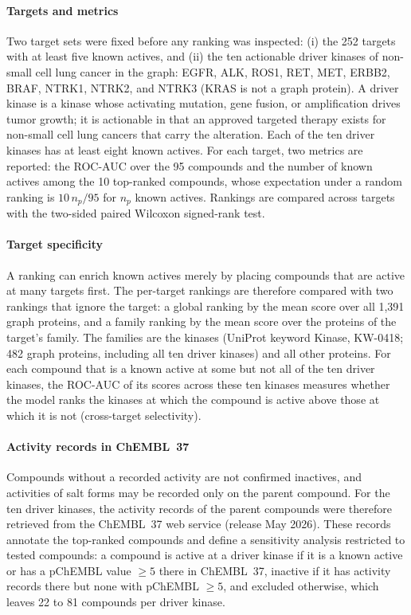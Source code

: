 \documentclass[11pt,letterpaper]{article}
\begin{document}
\paragraph{Targets and metrics}
Two target sets were fixed before any ranking was inspected: (i) the 252 targets with at least five known actives, and (ii) the ten actionable driver kinases of non-small cell lung cancer in the graph: EGFR, ALK, ROS1, RET, MET, ERBB2, BRAF, NTRK1, NTRK2, and NTRK3 (KRAS is not a graph protein). A driver kinase is a kinase whose activating mutation, gene fusion, or amplification drives tumor growth; it is actionable in that an approved targeted therapy exists for non-small cell lung cancers that carry the alteration. Each of the ten driver kinases has at least eight known actives. For each target, two metrics are reported: the ROC-AUC over the 95 compounds and the number of known actives among the 10 top-ranked compounds, whose expectation under a random ranking is $10\,n_p/95$ for $n_p$ known actives. Rankings are compared across targets with the two-sided paired Wilcoxon signed-rank test.

\paragraph{Target specificity}
A ranking can enrich known actives merely by placing compounds that are active at many targets first. The per-target rankings are therefore compared with two rankings that ignore the target: a global ranking by the mean score over all 1,391 graph proteins, and a family ranking by the mean score over the proteins of the target's family. The families are the kinases (UniProt keyword Kinase, KW-0418; 482 graph proteins, including all ten driver kinases) and all other proteins. For each compound that is a known active at some but not all of the ten driver kinases, the ROC-AUC of its scores across these ten kinases measures whether the model ranks the kinases at which the compound is active above those at which it is not (cross-target selectivity).

\paragraph{Activity records in ChEMBL~37}
Compounds without a recorded activity are not confirmed inactives, and activities of salt forms may be recorded only on the parent compound. For the ten driver kinases, the activity records of the parent compounds were therefore retrieved from the ChEMBL~37 web service (release May 2026). These records annotate the top-ranked compounds and define a sensitivity analysis restricted to tested compounds: a compound is active at a driver kinase if it is a known active or has a pChEMBL value $\geq 5$ there in ChEMBL~37, inactive if it has activity records there but none with pChEMBL $\geq 5$, and excluded otherwise, which leaves 22 to 81 compounds per driver kinase.
\end{document}
